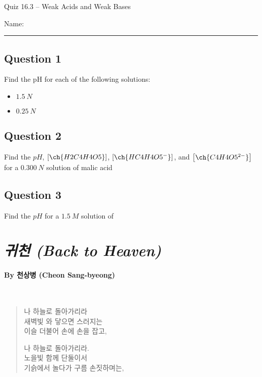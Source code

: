 \documentclass[11pt, letterpaper]{memoir}
\begin{document}
	\begin{center}
		{\large	Quiz 16.3 -- Weak Acids and Weak Bases}
	\end{center}
	{\large Name: \rule[-1mm]{4in}{.1pt} 
	
	
	\subsection*{Question 1}
	Find the pH for each of the following solutions:
	\begin{itemize}
		\item $1.5~N$ 
		
		\vspace{6em}
		\item $0.25~N$ 		
	\end{itemize}
	
	\vspace{6em}
	\subsection*{Question 2}
	Find the $pH$, $\left[\ch{H2C4H4O5}\right]$, $\left[\ch{HC4H4O5^-}\right]$, and  $\left[\ch{C4H4O5^{2-}}\right]$ for a $0.300~N$ solution of malic acid
	
	\vspace{14em}
	\subsection*{Question 3}
	Find the $pH$ for a $1.5~M$ solution of 
	\newpage
	\pagestyle{empty}
	\addtocounter{page}{-1}
	\section*{\emph{{귀천} (Back to Heaven)}}
	\paragraph{By {천상병} (Cheon Sang-byeong)}~
	
	{
		\begin{verse}
			나 하늘로 돌아가리라\\
			새벽빛 와 닿으면 스러지는\\
			이슬 더불어 손에 손을 잡고,
			
			나 하늘로 돌아가리라.\\
			노을빛 함께 단둘이서\\
			기슭에서 놀다가 구름 손짓하며는,
			

\end{verse}}}
\end{document}
